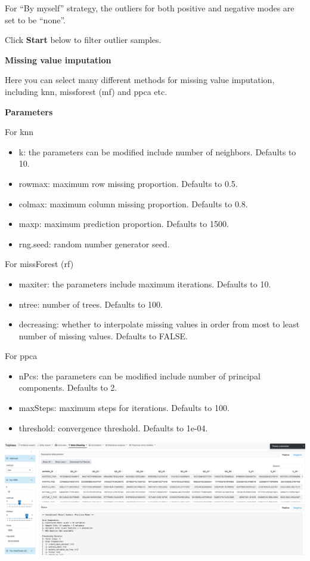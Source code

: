 \documentclass[
]{book}
\providecommand{\tightlist}{%
  \setlength{\itemsep}{0pt}\setlength{\parskip}{0pt}}
\begin{document}
For ``By myself'' strategy, the outliers for both positive and negative modes are set to be ``none''.

Click \textbf{Start} below to filter outlier samples.

\textbf{Missing value imputation}

Here you can select many different methods for missing value imputation, including knn, missforest (mf) and ppca etc.

\textbf{Parameters}

For knn

\begin{itemize}
\tightlist
\item
  k: the parameters can be modified include number of neighbors. Defaults to 10.
\item
  rowmax: maximum row missing proportion. Defaults to 0.5.
\item
  colmax: maximum column missing proportion. Defaults to 0.8.
\item
  maxp: maximum prediction proportion. Defaults to 1500.
\item
  rng.seed: random number generator seed.
\end{itemize}

For missForest (rf)

\begin{itemize}
\tightlist
\item
  maxiter: the parameters include maximum iterations. Defaults to 10.
\item
  ntree: number of trees. Defaults to 100.
\item
  decreasing: whether to interpolate missing values in order from most to least number of missing values. Defaults to FALSE.
\end{itemize}

For ppca

\begin{itemize}
\tightlist
\item
  nPcs: the parameters can be modified include number of principal components. Defaults to 2.
\item
  maxSteps: maximum steps for iterations. Defaults to 100.
\item
  threshold: convergence threshold. Defaults to 1e-04.
\end{itemize}

\includegraphics{figures/imputation1.png}
\end{document}
